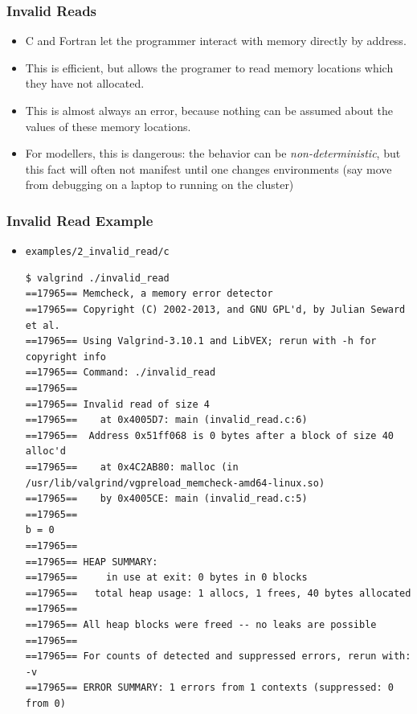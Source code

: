\documentclass{beamer}
\begin{document}
\begin{frame}[fragile]
  \frametitle{Invalid Reads}
  \begin{itemize}
    \item C and Fortran let the programmer interact with memory directly by address.
      \item This is efficient, but allows the programer to read memory locations which they have not allocated. 
        \item This is almost always an error, because nothing can be assumed about the values of these memory locations.
        \item For modellers, this is dangerous: the behavior can be \emph{non-deterministic}, but this fact will often not manifest until one changes environments (say move from debugging on a laptop to running on the cluster)
  \end{itemize}
\end{frame}

\begin{frame}[fragile]
  \frametitle{Invalid Read Example}
  \begin{itemize}
    \item \texttt{examples/2\_invalid\_read/c}
      \begin{lstlisting}
$ valgrind ./invalid_read
==17965== Memcheck, a memory error detector
==17965== Copyright (C) 2002-2013, and GNU GPL'd, by Julian Seward et al.
==17965== Using Valgrind-3.10.1 and LibVEX; rerun with -h for copyright info
==17965== Command: ./invalid_read
==17965==
==17965== Invalid read of size 4
==17965==    at 0x4005D7: main (invalid_read.c:6)
==17965==  Address 0x51ff068 is 0 bytes after a block of size 40 alloc'd
==17965==    at 0x4C2AB80: malloc (in /usr/lib/valgrind/vgpreload_memcheck-amd64-linux.so)
==17965==    by 0x4005CE: main (invalid_read.c:5)
==17965==
b = 0
==17965==
==17965== HEAP SUMMARY:
==17965==     in use at exit: 0 bytes in 0 blocks
==17965==   total heap usage: 1 allocs, 1 frees, 40 bytes allocated
==17965==
==17965== All heap blocks were freed -- no leaks are possible
==17965==
==17965== For counts of detected and suppressed errors, rerun with: -v
==17965== ERROR SUMMARY: 1 errors from 1 contexts (suppressed: 0 from 0)  
      \end{lstlisting}
  \end{itemize}
\end{frame}
\end{document}
